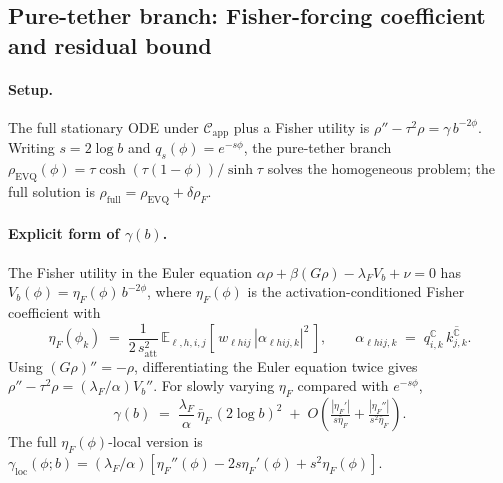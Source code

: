 \subsection{Pure-tether branch: Fisher-forcing coefficient and residual bound}
\label{sec:pure-tether-bound}

\paragraph{Setup.} The full stationary ODE under $\mathcal{C}_{\mathrm{app}}$ plus a Fisher utility is $\rho''-\tau^2\rho = \gamma\,b^{-2\phi}$. Writing $s{=}2\log b$ and $q_s(\phi){=}e^{-s\phi}$, the pure-tether branch $\rho_{\mathrm{EVQ}}(\phi) = \tau\cosh(\tau(1{-}\phi))/\sinh\tau$ solves the homogeneous problem; the full solution is $\rho_{\mathrm{full}} = \rho_{\mathrm{EVQ}} + \delta\rho_{F}$.

\paragraph{Explicit form of $\gamma(b)$.} The Fisher utility in the Euler equation $\alpha\rho + \beta(G\rho) - \lambda_F V_b + \nu = 0$ has $V_b(\phi) = \eta_F(\phi)\,b^{-2\phi}$, where $\eta_F(\phi)$ is the activation-conditioned Fisher coefficient with
\begin{equation}
\eta_F(\phi_k) \;=\; \frac{1}{2\,s_{\mathrm{att}}^2}\,\mathbb{E}_{\ell,h,i,j}\!\left[\,w_{\ell h ij}\,|\alpha_{\ell h ij,k}|^2\,\right],\qquad \alpha_{\ell h ij,k} \;=\; q_{i,k}^{\mathbb{C}}\,\overline{k_{j,k}^{\mathbb{C}}}.
\label{eq:eta-F}
\end{equation}
Using $(G\rho)''{=}-\rho$, differentiating the Euler equation twice gives $\rho'' - \tau^2\rho = (\lambda_F/\alpha) V_b''$. For slowly varying $\eta_F$ compared with $e^{-s\phi}$,
\begin{equation}
\boxed{\;\gamma(b) \;=\; \frac{\lambda_F}{\alpha}\,\bar\eta_F\,(2\log b)^2 \;+\; O\!\left(\tfrac{|\eta_F'|}{s\bar\eta_F} + \tfrac{|\eta_F''|}{s^2\bar\eta_F}\right).\;}
\label{eq:gamma-explicit}
\end{equation}
The full $\eta_F(\phi)$-local version is $\gamma_{\mathrm{loc}}(\phi;b) = (\lambda_F/\alpha)[\eta_F''(\phi) - 2s\eta_F'(\phi) + s^2\eta_F(\phi)]$.

